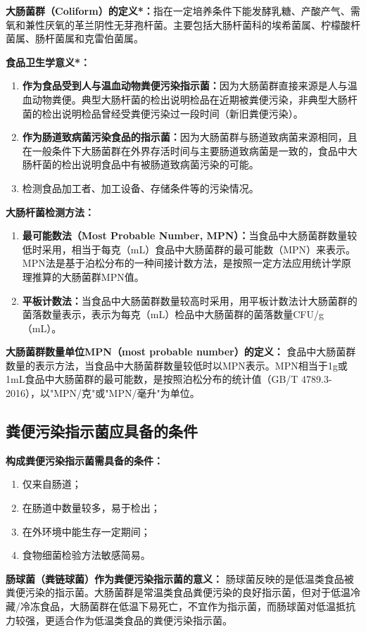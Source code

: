 \begin{keybox}
\textbf{大肠菌群（Coliform）的定义*：}指在一定培养条件下能发酵乳糖、产酸产气、需氧和兼性厌氧的革兰阴性无芽孢杆菌。主要包括大肠杆菌科的埃希菌属、柠檬酸杆菌属、肠杆菌属和克雷伯菌属。

\textbf{食品卫生学意义*：}
\begin{enumerate}[leftmargin=*]
    \item \textbf{作为食品受到人与温血动物粪便污染指示菌：}因为大肠菌群直接来源是人与温血动物粪便。典型大肠杆菌的检出说明检品在近期被粪便污染，非典型大肠杆菌的检出说明检品曾经受粪便污染过一段时间（新旧粪便污染）。
    \item \textbf{作为肠道致病菌污染食品的指示菌：}因为大肠菌群与肠道致病菌来源相同，且在一般条件下大肠菌群在外界存活时间与主要肠道致病菌是一致的，食品中大肠杆菌的检出说明食品中有被肠道致病菌污染的可能。
    \item 检测食品加工者、加工设备、存储条件等的污染情况。
\end{enumerate}

\textbf{大肠杆菌检测方法：}
\begin{enumerate}[leftmargin=*]
    \item \textbf{最可能数法（Most Probable Number, MPN）：}当食品中大肠菌群数量较低时采用，相当于每克（mL）食品中大肠菌群的最可能数（MPN）来表示。MPN法是基于泊松分布的一种间接计数方法，是按照一定方法应用统计学原理推算的大肠菌群MPN值。
    \item \textbf{平板计数法：}当食品中大肠菌群数量较高时采用，用平板计数法计大肠菌群的菌落数量表示，表示为每克（mL）检品中大肠菌群的菌落数量CFU/g（mL）。
\end{enumerate}

\textbf{大肠菌群数量单位MPN（most probable number）的定义：}
食品中大肠菌群数量的表示方法，当食品中大肠菌群数量较低时以MPN表示。MPN相当于1g或1mL食品中大肠菌群的最可能数，是按照泊松分布的统计值（GB/T 4789.3-2016），以"MPN/克"或"MPN/毫升"为单位。
\end{keybox}

\subsection{粪便污染指示菌应具备的条件}

\begin{defbox}
\textbf{构成粪便污染指示菌需具备的条件：}
\begin{enumerate}[leftmargin=*]
    \item 仅来自肠道；
    \item 在肠道中数量较多，易于检出；
    \item 在外环境中能生存一定期间；
    \item 食物细菌检验方法敏感简易。
\end{enumerate}

\textbf{肠球菌（粪链球菌）作为粪便污染指示菌的意义：}
肠球菌反映的是低温类食品被粪便污染的指示菌。大肠菌群是常温类食品粪便污染的良好指示菌，但对于低温冷藏/冷冻食品，大肠菌群在低温下易死亡，不宜作为指示菌，而肠球菌对低温抵抗力较强，更适合作为低温类食品的粪便污染指示菌。%
\end{defbox}


